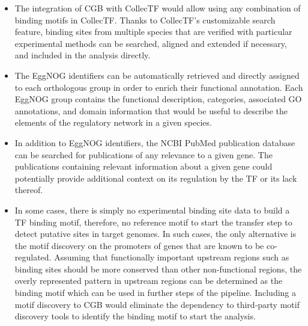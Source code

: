 \documentclass[12pt]{article}
\begin{document}
\begin{itemize}
\item The integration of CGB with CollecTF would allow using any combination of
  binding motifs in CollecTF\@. Thanks to CollecTF's customizable search feature,
  binding sites from multiple species that are verified with particular
  experimental methods can be searched, aligned and extended if necessary, and
  included in the analysis directly.

\item The EggNOG identifiers can be automatically retrieved and directly
  assigned to each orthologous group in order to enrich their functional
  annotation. Each EggNOG group contains the functional description,
  categories, associated GO annotations, and domain information that would be
  useful to describe the elements of the regulatory network in a given species.

\item In addition to EggNOG identifiers, the NCBI PubMed publication database
  can be searched for publications of any relevance to a given gene. The
  publications containing relevant information about a given gene could
  potentially provide additional context on its regulation by the TF or its
  lack thereof.

\item In some cases, there is simply no experimental binding site data to build
  a TF binding motif, therefore, no reference motif to start the transfer step
  to detect putative sites in target genomes. In such cases, the only
  alternative is the motif discovery on the promoters of genes that are known
  to be co-regulated. Assuming that functionally important upstream regions
  such as binding sites should be more conserved than other non-functional
  regions, the overly represented pattern in upstream regions can be determined
  as the binding motif which can be used in further steps of the
  pipeline. Including a motif discovery to CGB would eliminate the dependency
  to third-party motif discovery tools to identify the binding motif to start
  the analysis.

\end{itemize}
\end{document}
